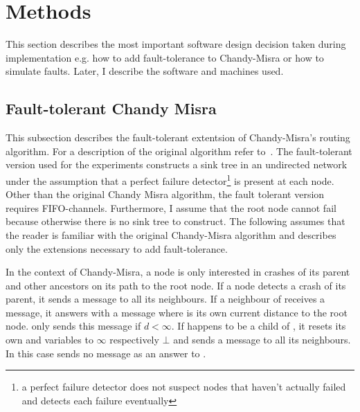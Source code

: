 \section{Methods}
\label{sec:methods}
This section describes the most important software design decision taken during implementation e.g. how to add fault-tolerance to Chandy-Misra or how to simulate faults.
Later, I describe the software and machines used.

\subsection {Fault-tolerant Chandy Misra}
\label{ssec:fault-tolerant-chandy-misra}
This subsection describes the fault-tolerant extentsion of Chandy-Misra's routing algorithm.
For a description of the original algorithm refer to~\cite[page 56]{fokkink:2018}.
The fault-tolerant version used for the experiments constructs a sink tree in an undirected network under the assumption that a perfect failure detector\footnote{a perfect failure detector does not suspect nodes that haven't actually failed and detects each failure eventually} is present at each node.
Other than the original Chandy Misra algorithm, the fault tolerant version requires FIFO-channels.
Furthermore, I assume that the root node cannot fail because otherwise there is no sink tree to construct.
The following assumes that the reader is familiar with the original Chandy-Misra algorithm and describes only the extensions necessary to add fault-tolerance.

In the context of Chandy-Misra, a node is only interested in crashes of its parent and other ancestors on its path to the root node.
If a node  detects a crash of its parent, it sends a  message to all its neighbours.
If a neighbour  of  receives a  message, it answers with a  message where  is its own current distance to the root node.
 only sends this message if $d < \infty $.
If  happens to be a child of , it resets its own  and  variables to $\infty$ respectively $\bot$ and sends a  message to all its neighbours.
In this case  sends no  message as an answer to .

